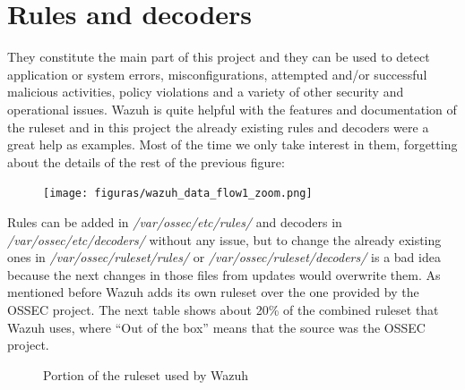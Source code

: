 \section{Rules and decoders}
They constitute the main part of this project and they can be used to detect application or system errors, misconfigurations, attempted and/or successful malicious activities, policy violations and a variety of other security and operational issues\cite{wazuh_index}. Wazuh is quite helpful with the features and documentation of the ruleset and in this project the already existing rules and decoders were a great help as examples.
\linej
\linej
Most of the time we only take interest in them, forgetting about the details of the rest of the previous figure:
\begin{figure}[H]
  \centering
	\texttt{[image: figuras/wazuh\_data\_flow1\_zoom.png]}
\end{figure}
\linej
Rules can be added in \textit{/var/ossec/etc/rules/} and decoders in \textit{/var/ossec/etc/decoders/} without any issue, but to change the already existing ones in \textit{/var/ossec/ruleset/rules/} or \textit{/var/ossec/ruleset/decoders/} is a bad idea because the next changes in those files from updates would overwrite them.
\linej
\linej
As mentioned before Wazuh adds its own ruleset over the one provided by the OSSEC project. The next table shows about 20\% of the combined ruleset that Wazuh uses, where ``Out of the box'' means that the source was the OSSEC project.
\begin{figure}[H]
  \centering
	\caption{Portion of the ruleset used by Wazuh\cite{wazuh_ossec_ruleset}}
\end{figure}
